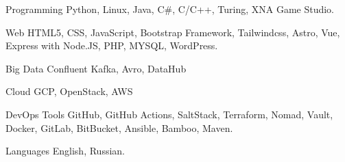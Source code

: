 \vspace{-1.75mm}


\begin{cvskills}


\cvskill
{Programming} %
{Python, Linux, Java, C\#, C/C++, Turing, XNA Game Studio.} %


\cvskill
{Web} %
{HTML5, CSS, JavaScript, Bootstrap Framework, Tailwindcss, Astro, Vue, Express with Node.JS, PHP, MYSQL, WordPress.} %


\cvskill
{Big Data} %
{Confluent Kafka, Avro, DataHub} %

\cvskill
{Cloud} %
{GCP, OpenStack, AWS} %


\cvskill
{DevOps Tools} %
{GitHub, GitHub Actions, SaltStack, Terraform, Nomad, Vault, Docker, GitLab, BitBucket, Ansible, Bamboo, Maven.} %

\cvskill
{Languages} %
{English, Russian.} %


\end{cvskills}